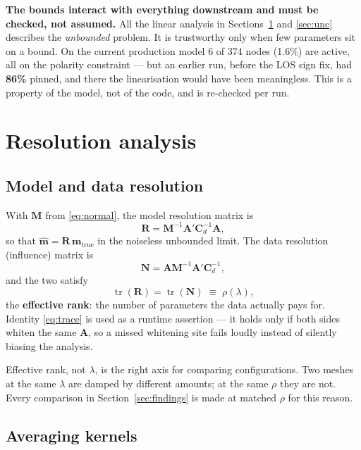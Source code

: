 \documentclass[11pt,a4paper]{article}
\newcommand{\R}{\mathbf{R}}
\newcommand{\A}{\mathbf{A}}
\newcommand{\Cd}{\mathbf{C}_d}
\newcommand{\M}{\mathbf{M}}
\newcommand{\bfm}{\bm{m}}
\newcommand{\note}[1]{\textcolor{red!60!black}{\textbf{#1}}}
\begin{document}
\note{The bounds interact with everything downstream and must be checked, not
assumed.} All the linear analysis in Sections~\ref{sec:res} and \ref{sec:unc}
describes the \emph{unbounded} problem. It is trustworthy only when few
parameters sit on a bound. On the current production model 6 of 374 nodes
(1.6\%) are active, all on the polarity constraint --- but an earlier run, before
the LOS sign fix, had \textbf{86\%} pinned, and there the linearisation would
have been meaningless. This is a property of the model, not of the code, and is
re-checked per run.

\section{Resolution analysis}
\label{sec:res}

\subsection{Model and data resolution}

With $\M$ from \eqref{eq:normal}, the model resolution matrix is
\begin{equation}
\R = \M^{-1}\A'\Cd^{-1}\A ,
\label{eq:R}
\end{equation}
so that $\hat{\bfm} = \R\,\bfm_{\text{true}}$ in the noiseless unbounded limit.
The data resolution (influence) matrix is
\begin{equation}
\bm{N} = \A\M^{-1}\A'\Cd^{-1},
\end{equation}
and the two satisfy
\begin{equation}
\operatorname{tr}(\R) = \operatorname{tr}(\bm{N}) \;\equiv\; \rho(\lambda),
\label{eq:trace}
\end{equation}
the \textbf{effective rank}: the number of parameters the data actually pays for.
Identity \eqref{eq:trace} is used as a runtime assertion --- it holds only if both
sides whiten the same $\A$, so a missed whitening site fails loudly instead of
silently biasing the analysis.

Effective rank, not $\lambda$, is the right axis for comparing configurations.
Two meshes at the same $\lambda$ are damped by different amounts; at the same
$\rho$ they are not. Every comparison in Section~\ref{sec:findings} is made at
matched $\rho$ for this reason.

\subsection{Averaging kernels}
\end{document}
